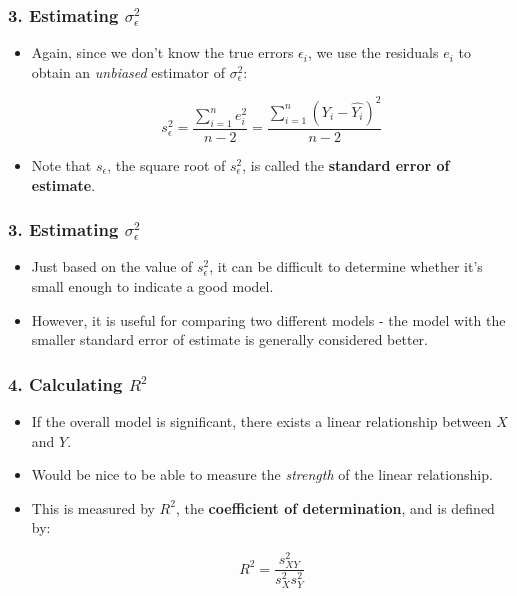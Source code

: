 \documentclass[12pt]{beamer}
\begin{document}
\begin{frame}
	\frametitle{3. Estimating $\sigma_\epsilon^2$}
	
	\begin{itemize}[label={\color{blue}$\blacktriangleright$}]
		\item Again, since we don't know the true errors $\epsilon_i$, we use the residuals $e_i$ to obtain an \emph{unbiased} estimator of $\sigma_\epsilon^2$:
		
		\[
		s_\epsilon^2 = \frac{\sum_{i=1}^n e_i^2}{n-2} = \frac{\sum_{i=1}^n \left(Y_i - \hat{Y_i}\right)^2}{n-2}
		\]
		
		\item Note that $s_\epsilon$, the square root of $s_\epsilon^2$, is called the \textbf{standard error of estimate}.
	\end{itemize}
\end{frame}
\begin{frame}
	\frametitle{3. Estimating $\sigma_\epsilon^2$}
	
	\begin{itemize}[label={\color{blue}$\blacktriangleright$}]
		\item Just based on the value of $s_\epsilon^2$, it can be difficult to determine whether it's small enough to indicate a good model.
		
		\item However, it is useful for comparing two different models - the model with the smaller standard error of estimate is generally considered better.
	\end{itemize}
\end{frame}
\begin{frame}
	\frametitle{4. Calculating $R^2$}
	
	\begin{itemize}[label={\color{blue}$\blacktriangleright$}]
		\item If the overall model is significant, there exists a linear relationship between $X$ and $Y$.
		
		\item Would be nice to be able to measure the \emph{strength} of the linear relationship.
		
		\item This is measured by $R^2$, the \textbf{coefficient of determination}, and is defined by:
		
		\[
		R^2 = \frac{s_{XY}^2}{s_X^2 s_Y^2}
		\]
	\end{itemize}
\end{frame}
\end{document}
